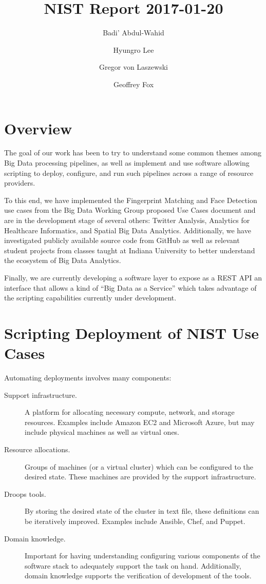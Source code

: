 \documentclass[9pt,twocolumn,twoside]{styles/osajnl}
\title{NIST Report 2017-01-20}
\author[1]{Badi' Abdul-Wahid}
\author[1]{Hyungro Lee}
\author[1]{Gregor von Laszewski}
\author[1,*]{Geoffrey Fox}
\affil[1]{School of Informatics and Computing, Bloomington, IN 47408, U.S.A.}
\affil[*]{Corresponding authors: gcf@indiana.edu}
\begin{document}
\maketitle


\section{Overview}

The goal of our work has been to try to understand some common themes
among Big Data processing pipelines, as well as implement and use
software allowing scripting to deploy, configure, and run such
pipelines across a range of resource providers.

To this end, we have implemented the Fingerprint Matching and Face
Detection use cases from the Big Data Working Group proposed Use Cases document
and are in the development stage of several others: Twitter Analysis,
Analytics for Healthcare Informatics, and Spatial Big Data
Analytics. Additionally, we have investigated publicly available source code
from GitHub as well as relevant student projects from classes taught at Indiana
University to better understand the ecosystem of Big Data Analytics.

Finally, we are currently developing a software layer to expose as a
REST API an interface that allows a kind of ``Big Data as a Service''
which takes advantage of the scripting capabilities currently under
development.

\section{Scripting Deployment of NIST Use Cases}

Automating deployments involves many components: \smallskip

\begin{description}
\item[Support infrastructure.] A platform for allocating necessary
  compute, network, and storage resources. Examples include Amazon EC2
  and Microsoft Azure, but may include physical machines as well as
  virtual ones.
\item[Resource allocations.] Groups of machines (or a virtual cluster)
  which can be configured to the desired state. These machines are
  provided by the support infrastructure.
\item[Droops tools.] By storing the desired state of the cluster in
  text file, these definitions can be iteratively improved. Examples
  include Ansible, Chef, and Puppet.
\item[Domain knowledge.] Important for having understanding
  configuring various components of the software stack to adequately
  support the task on hand. Additionally, domain knowledge supports
  the verification of development of the tools.
\end{description}
\end{document}
